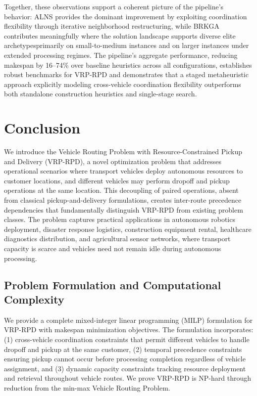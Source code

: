 \documentclass{article}
\begin{document}
Together, these observations support a coherent picture of the pipeline's behavior: ALNS provides the dominant improvement by exploiting coordination flexibility through iterative neighborhood restructuring, while BRKGA contributes meaningfully where the solution landscape supports diverse elite archetypes\textemdash primarily on small-to-medium instances and on larger instances under extended processing regimes. The pipeline's aggregate performance, reducing makespan by 16--74\% over baseline heuristics across all configurations, establishes robust benchmarks for VRP-RPD and demonstrates that a staged metaheuristic approach explicitly modeling cross-vehicle coordination flexibility outperforms both standalone construction heuristics and single-stage search.

\section{Conclusion}
\label{sec:conclusion}

We introduce the Vehicle Routing Problem with Resource-Constrained Pickup and Delivery (VRP-RPD), a novel optimization problem that addresses operational scenarios where transport vehicles deploy autonomous resources to customer locations, and different vehicles may perform dropoff and pickup operations at the same location. This decoupling of paired operations, absent from classical pickup-and-delivery formulations, creates inter-route precedence dependencies that fundamentally distinguish VRP-RPD from existing problem classes. The problem captures practical applications in autonomous robotics deployment, disaster response logistics, construction equipment rental, healthcare diagnostics distribution, and agricultural sensor networks, where transport capacity is scarce and vehicles need not remain idle during autonomous processing.

\subsection{Problem Formulation and Computational Complexity}

We provide a complete mixed-integer linear programming (MILP) formulation for VRP-RPD with makespan minimization objectives. The formulation incorporates: (1) cross-vehicle coordination constraints that permit different vehicles to handle dropoff and pickup at the same customer, (2) temporal precedence constraints ensuring pickup cannot occur before processing completion regardless of vehicle assignment, and (3) dynamic capacity constraints tracking resource deployment and retrieval throughout vehicle routes. We prove VRP-RPD is NP-hard through reduction from the min-max Vehicle Routing Problem.
\end{document}
